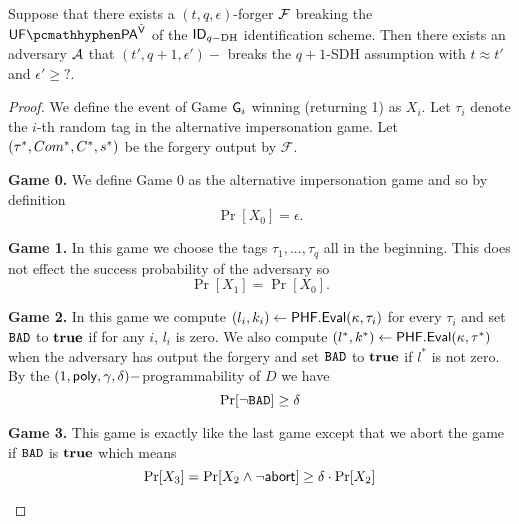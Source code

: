 \begin{theorem}
Suppose that there exists a $(t, q, \epsilon)$-forger $\mathcal{F}$ breaking the $\imp^{\IDAltV}$ of the $\mathsf{ID}_{q-\text{DH}}$ identification scheme. Then there exists an adversary $\mathcal{A}$ that $(t',q+1,\epsilon')-$ breaks the $q+1$-SDH assumption with $t \approx t'$ and 
$\epsilon' \geq ?.$
\end{theorem}
\begin{proof}
We define the event of Game $\mathsf{G}_i$ winning (returning 1) as $X_i$. Let $\tau_i$ denote the $i$-th random tag in the alternative impersonation game. Let $(\tau^*,Com^*, C^*, s^*)$ be the forgery output by $\mathcal{F}$.
\begin{description}[wide,itemindent=\labelsep]
\item [] \textbf{Game 0.} We define Game 0 as the alternative impersonation game and so by definition
$$\Pr[X_0] = \epsilon.$$
\item [] \textbf{Game 1.} In this game we choose the tags $\tau_1,...,\tau_q$ all in the beginning. This does not effect the success probability of the adversary so 
$$\Pr[X_1] = \Pr[X_0].$$
\item [] \textbf{Game 2.} In this game we compute
$(l_i,k_i) \leftarrow \mathsf{PHF}.\mathsf{Eval}(\kappa,\tau_i)$ for every $\tau_i$ and set $\texttt{BAD}$ to $\textbf{true}$ if for any $i$, $l_i$ is zero. We also compute $(l^*,k^*) \leftarrow \mathsf{PHF}.\mathsf{Eval}(\kappa,\tau^*)$ when the adversary has output the forgery and set $\texttt{BAD}$ to $\textbf{true}$ if $l^*$ is not zero.
\\
By the $(1, \mathsf{poly}, \gamma, \delta)-$programmability of $D$ we have
$$\Pr[\neg \texttt{BAD}] \geq \delta$$
\item [] \textbf{Game 3.} This game is exactly like the last game except that we abort the game if $\texttt{BAD}$ is $\textbf{true}$ which means
$$\Pr[X_3] = \Pr[X_2 \land \neg \mathsf{abort}] \geq \delta \cdot \Pr[X_2]$$
\end{description}


\begin{figure}[htb!]
    \centering
    \nicoresetlinenr
\end{figure}
\end{proof}
